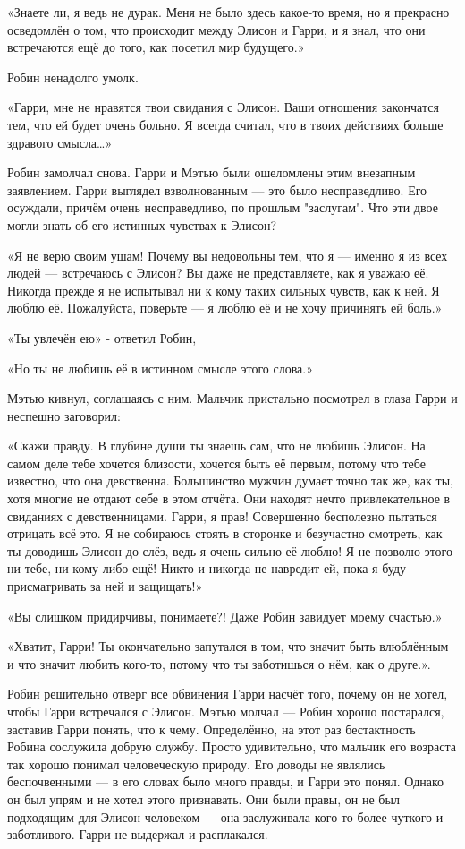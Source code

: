 \documentclass[a5paper, 9pt,
final, openany, twoside=true]{memoir}
\begin{document}
«Знаете ли, я ведь не дурак. Меня не было здесь какое-то время, но я прекрасно осведомлён о том, что происходит между Элисон и Гарри, и я знал, что они встречаются ещё до того, как посетил мир будущего.»

Робин ненадолго умолк.

«Гарри, мне не нравятся твои свидания с Элисон. Ваши отношения закончатся тем, что ей будет очень больно. Я всегда считал, что в твоих действиях больше здравого смысла…»

Робин замолчал снова. Гарри и Мэтью были ошеломлены этим внезапным заявлением. Гарри выглядел взволнованным — это было несправедливо. Его осуждали, причём очень несправедливо, по прошлым "заслугам". Что эти двое могли знать об его истинных чувствах к Элисон?

«Я не верю своим ушам! Почему вы недовольны тем, что я — именно я из всех людей — встречаюсь с Элисон? Вы даже не представляете, как я уважаю её. Никогда прежде я не испытывал ни к кому таких сильных чувств, как к ней. Я люблю её. Пожалуйста, поверьте — я люблю её и не хочу причинять ей боль.»

«Ты увлечён ею» - ответил Робин,

«Но ты не любишь её в истинном смысле этого слова.»

Мэтью кивнул, соглашаясь с ним. Мальчик пристально посмотрел в глаза Гарри и неспешно заговорил:

«Скажи правду. В глубине души ты знаешь сам, что не любишь Элисон. На самом деле тебе хочется близости, хочется быть её первым, потому что тебе известно, что она девственна. Большинство мужчин думает точно так же, как ты, хотя многие не отдают себе в этом отчёта. Они находят нечто привлекательное в свиданиях с девственницами. Гарри, я прав! Совершенно бесполезно пытаться отрицать всё это. Я не собираюсь стоять в сторонке и безучастно смотреть, как ты доводишь Элисон до слёз, ведь я очень сильно её люблю! Я не позволю этого ни тебе, ни кому-либо ещё! Никто и никогда не навредит ей, пока я буду присматривать за ней и защищать!»

«Вы слишком придирчивы, понимаете?! Даже Робин завидует моему счастью.»

«Хватит, Гарри! Ты окончательно запутался в том, что значит быть влюблённым и что значит любить кого-то, потому что ты заботишься о нём, как о друге.».

Робин решительно отверг все обвинения Гарри насчёт того, почему он не хотел, чтобы Гарри встречался с Элисон. Мэтью молчал — Робин хорошо постарался, заставив Гарри понять, что к чему. Определённо, на этот раз бестактность Робина сослужила добрую службу. Просто удивительно, что мальчик его возраста так хорошо понимал человеческую природу. Его доводы не являлись беспочвенными — в его словах было много правды, и Гарри это понял. Однако он был упрям и не хотел этого признавать. Они были правы, он не был подходящим для Элисон человеком — она заслуживала кого-то более чуткого и заботливого. Гарри не выдержал и расплакался.
\end{document}
